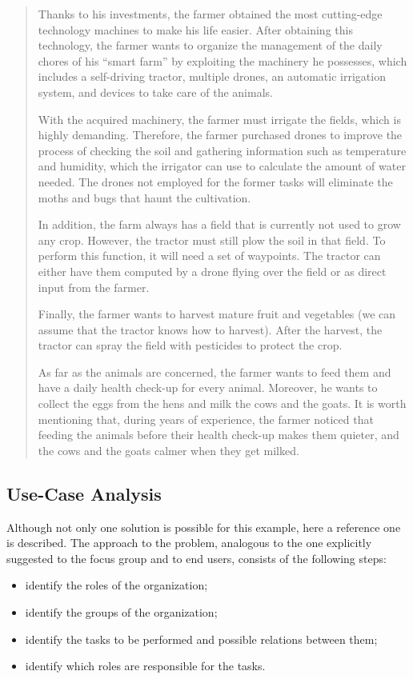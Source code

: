 \begin{quote}
Thanks to his investments, the farmer obtained the most cutting-edge technology machines to make his life easier.
After obtaining this technology, the farmer wants to organize the management of the daily chores of his ``smart farm'' by exploiting the machinery he possesses, which includes a self-driving tractor, multiple drones, an automatic irrigation system, and devices to take care of the animals.

With the acquired machinery, the farmer must irrigate the fields, which is highly demanding.
Therefore, the farmer purchased drones to improve the process of checking the soil and gathering information such as temperature and humidity, which the irrigator can use to calculate the amount of water needed.
The drones not employed for the former tasks will eliminate the moths and bugs that haunt the cultivation.

In addition, the farm always has a field that is currently not used to grow any crop.
However, the tractor must still plow the soil in that field.
To perform this function, it will need a set of waypoints.
The tractor can either have them computed by a drone flying over the field or as direct input from the farmer.

Finally, the farmer wants to harvest mature fruit and vegetables (we can assume that the tractor knows how to harvest).
After the harvest, the tractor can spray the field with pesticides to protect the crop.

As far as the animals are concerned, the farmer wants to feed them and have a daily health check-up for every animal. 
Moreover, he wants to collect the eggs from the hens and milk the cows and the goats.
It is worth mentioning that, during years of experience, the farmer noticed that feeding the animals before their health check-up makes them quieter, and the cows and the goats calmer when they get milked.
\end{quote}

\subsection{Use-Case Analysis}
Although not only one solution is possible for this example, here a reference one is described.
The approach to the problem, analogous to the one explicitly suggested to the focus group and to end users, consists of the following steps:
\begin{itemize}
    \item identify the roles of the organization;
    \item identify the groups of the organization;
    \item identify the tasks to be performed and possible relations between them;
    \item identify which roles are responsible for the tasks.
\end{itemize}

